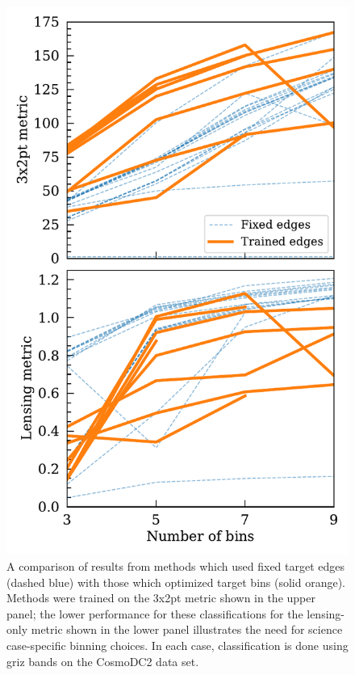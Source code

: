 \documentclass[twocolumn,twocolappendix]{aastex63}
\begin{document}
\begin{figure}
\includegraphics[width=0.9\columnwidth]{results/edge_comparison.pdf}
\caption{A comparison of results from methods which used fixed target edges (dashed blue)
with those which optimized target bins (solid orange).  Methods were trained on the 3x2pt metric
shown in the upper panel; the lower performance for these classifications 
for the lensing-only metric shown in the lower panel illustrates the need for science case-specific
binning choices. In each case, classification is done using griz bands on the CosmoDC2 data set.}
\label{fig:edges}
\end{figure}
\end{document}
